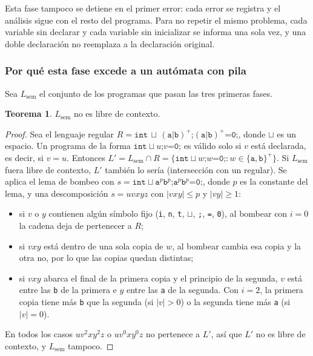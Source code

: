 \documentclass[11pt,a4paper]{article}
\theoremstyle{definition}
\newtheorem{teorema}{Teorema}
\newcommand{\tm}[1]{\texttt{#1}}
\renewcommand{\paragraph}[1]{\subsubsection*{#1}}
\begin{document}
Esta fase tampoco se detiene en el primer error: cada error se registra y el
análisis sigue con el resto del programa. Para no repetir el mismo problema,
cada variable sin declarar y cada variable sin inicializar se informa una
sola vez, y una doble declaración no reemplaza a la declaración original.

\paragraph{Por qué esta fase excede a un autómata con pila}

Sea $L_{\mathrm{sem}}$ el conjunto de los programas que pasan las tres
primeras fases.

\begin{teorema}
$L_{\mathrm{sem}}$ no es libre de contexto.
\end{teorema}

\begin{proof}
Sea el lenguaje regular
$R = \tm{int}\,\sqcup\,(\tm{a}|\tm{b})^{+}\tm{;}(\tm{a}|\tm{b})^{+}\tm{=0;}$,
donde $\sqcup$ es un espacio. Un programa de la forma
$\tm{int}\sqcup u\tm{;}v\tm{=0;}$ es válido solo si $v$ está declarada, es
decir, si $v = u$. Entonces
$L' = L_{\mathrm{sem}} \cap R = \{\tm{int}\sqcup w\tm{;}w\tm{=0;} : w \in \{\tm{a},\tm{b}\}^{+}\}$.
Si $L_{\mathrm{sem}}$ fuera libre de contexto, $L'$ también lo sería
(intersección con un regular). Se aplica el lema de bombeo con
$s = \tm{int}\sqcup\tm{a}^p\tm{b}^p\tm{;}\tm{a}^p\tm{b}^p\tm{=0;}$, donde $p$
es la constante del lema, y una descomposición $s = uvxyz$ con
$|vxy| \le p$ y $|vy| \ge 1$:
\begin{itemize}
  \item si $v$ o $y$ contienen algún símbolo fijo (\tm{i}, \tm{n}, \tm{t},
  $\sqcup$, \tm{;}, \tm{=}, \tm{0}), al bombear con $i = 0$ la cadena deja de
  pertenecer a $R$;
  \item si $vxy$ está dentro de una sola copia de $w$, al bombear cambia esa
  copia y la otra no, por lo que las copias quedan distintas;
  \item si $vxy$ abarca el final de la primera copia y el principio de la
  segunda, $v$ está entre las \tm{b} de la primera e $y$ entre las \tm{a} de
  la segunda. Con $i = 2$, la primera copia tiene más \tm{b} que la segunda
  (si $|v| > 0$) o la segunda tiene más \tm{a} (si $|v| = 0$).
\end{itemize}
En todos los casos $uv^2xy^2z$ o $uv^0xy^0z$ no pertenece a $L'$, así que
$L'$ no es libre de contexto, y $L_{\mathrm{sem}}$ tampoco.
\end{proof}
\end{document}
